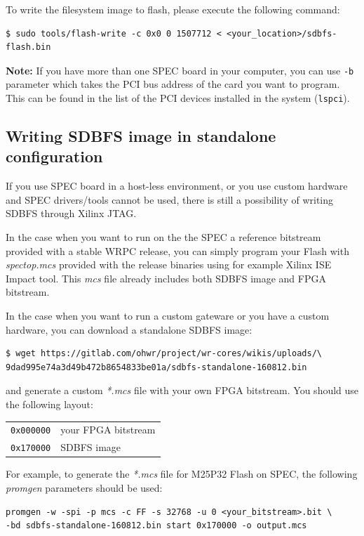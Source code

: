 \documentclass[a4paper, 12pt]{article}
\renewcommand{\_}{\underscore\allowbreak}
\newcommand{\code}[1]{\texttt{#1}}
\begin{document}
To write the filesystem image to flash, please execute the following
command:
\begin{lstlisting}
$ sudo tools/flash-write -c 0x0 0 1507712 < <your_location>/sdbfs-flash.bin
\end{lstlisting}

\noindent\textbf{Note:} If you have more than one SPEC board in your computer,
you can use \code{-b} parameter which takes the PCI bus address of the card you
want to program. This can be found in the list of the PCI devices installed in
the system (\code{lspci}).

\subsection{Writing SDBFS image in standalone configuration}

If you use SPEC board in a host-less environment, or you use custom
hardware and SPEC drivers/tools cannot be used, there is still a
possibility of writing SDBFS through Xilinx JTAG.

\vspace{1em}
In the case when you want to run on the the SPEC a reference bitstream provided with a stable
WRPC release, you can simply program your Flash with \textit{spec\_top.mcs}
provided with the release binaries using for example Xilinx ISE Impact tool.
This \textit{mcs} file already includes both SDBFS image and FPGA bitstream.

In the case when you want to run a custom gateware or you have a custom hardware, you can
download a standalone SDBFS image:
\begin{lstlisting}
$ wget https://gitlab.com/ohwr/project/wr-cores/wikis/uploads/\
9dad995e74a3d49b472b8654833be01a/sdbfs-standalone-160812.bin
\end{lstlisting}
and generate a custom \textit{*.mcs} file with your own FPGA bitstream. You should
use the following layout:
\begin{longtable}{  l  l }
\code{0x000000} & your FPGA bitstream \\
\code{0x170000} & SDBFS image\\
\end{longtable}

For example, to generate the \textit{*.mcs} file for M25P32 Flash on SPEC, the
following \textit{promgen} parameters should be used:
\begin{lstlisting}
promgen -w -spi -p mcs -c FF -s 32768 -u 0 <your_bitstream>.bit \
-bd sdbfs-standalone-160812.bin start 0x170000 -o output.mcs
\end{lstlisting}
\end{document}
